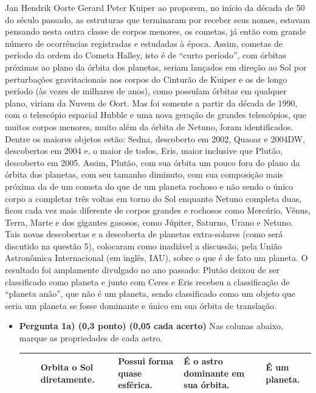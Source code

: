 \documentclass[a4paper, 12pt]{article}
\begin{document}
\begin{flushleft}
\begin{itemize}
Jan Hendrik Oorte Gerard Peter Kuiper ao proporem, no início da década de 50 do século passado, as estruturas que terminaram por receber seus nomes, estavam pensando nesta outra classe de corpos menores, os cometas, já então com grande número de ocorrências registradas e estudadas à época. Assim, cometas de período da ordem do Cometa Halley, isto é de ``curto período'', com órbitas próximas ao plano da órbita dos planetas, seriam lançados em direção ao Sol por perturbações gravitacionais nos corpos do Cinturão de Kuiper e os de longo período (às vezes de milhares de anos), como possuíam órbitas em qualquer plano, viriam da Nuvem de Oort. Mas foi somente a partir da década de 1990, com o telescópio espacial Hubble e uma nova geração de grandes telescópios, que muitos corpos menores, muito além da órbita de Netuno, foram identificados. Dentre os maiores objetos estão: Sedna, descoberto em 2002, Quaoar e 2004DW, descobertos em 2004 e, o maior de todos, Eris, maior inclusive que Plutão, descoberto em 2005. Assim, Plutão, com sua órbita um pouco fora do plano da órbita dos planetas, com seu tamanho diminuto, com sua composição mais próxima da de um cometa do que de um planeta rochoso e não sendo o único corpo a completar três voltas em torno do Sol enquanto Netuno completa duas, ficou cada vez mais diferente de corpos grandes e rochosos como Mercúrio, Vênus, Terra, Marte e dos gigantes gasosos, como Júpiter, Saturno, Urano e Netuno. Tais novas descobertas e a descoberta de planetas extra-solares (como será discutido na questão 5), colocaram como inadiável a discussão, pela União Astronômica Internacional (em inglês, IAU), sobre o que é de fato um planeta. O resultado foi amplamente divulgado no ano passado: Plutão deixou de ser classificado como planeta e junto com Ceres e Eris recebeu a classificação de ``planeta anão'', que não é um planeta, sendo classificado como um objeto que seria um planeta se fosse dominante e único em sua órbita de translação.
                \begin{itemize}
                    \item \textbf{Pergunta 1a) (0,3 ponto) (0,05 cada acerto)} Nas colunas abaixo, marque as propriedades de cada astro.
                        \begin{center} \begin{tabular}
                        {
                            |M{0.15\textwidth}|M{0.15\textwidth}|M{0.15\textwidth}|M{0.15\textwidth}|M{0.15\textwidth}|
                        }
                            \hline
                            $\quad$ & Orbita o Sol diretamente. & Possui forma quase esférica. & É o astro dominante em sua órbita. & É um planeta. \\ \hline

\end{tabular}
\end{center}
\end{itemize}
\end{itemize}
\end{flushleft}
\end{document}
